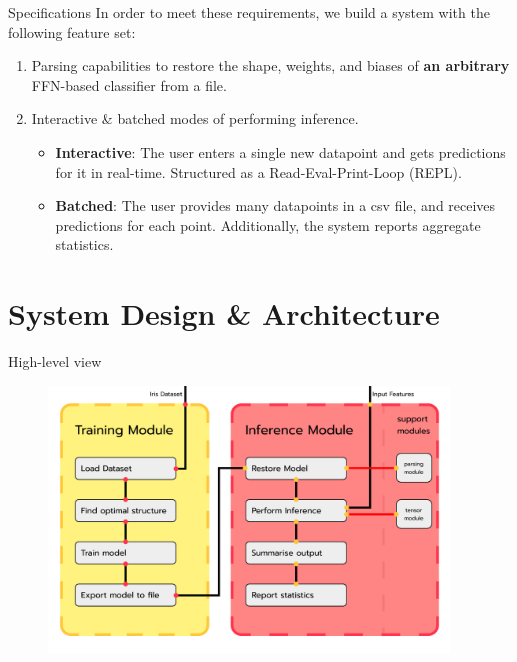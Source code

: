 \documentclass{beamer}
\begin{document}
\begin{frame}{Specifications}
  In order to meet these requirements, we build a system with the following feature set:
  \begin{enumerate}
    \item<2-> Parsing capabilities to restore the shape, weights, and biases of \textbf{an arbitrary} FFN-based classifier from a file.
    \item<3-> Interactive \& batched modes of performing inference. \begin{itemize}
      \item \textbf{Interactive}: The user enters a single new datapoint and gets predictions for it in real-time. Structured as a Read-Eval-Print-Loop (REPL).
      \item<4-> \textbf{Batched}: The user provides many datapoints in a csv file, and receives predictions for each point. Additionally, the system reports aggregate statistics.
    \end{itemize}
  \end{enumerate}  
\end{frame}

\section{System Design \& Architecture}
\begin{frame}{High-level view}
  \begin{figure}
    \includegraphics[width=0.95\textwidth]{../images/modules.png}
  \end{figure}
\end{frame}
\end{document}
